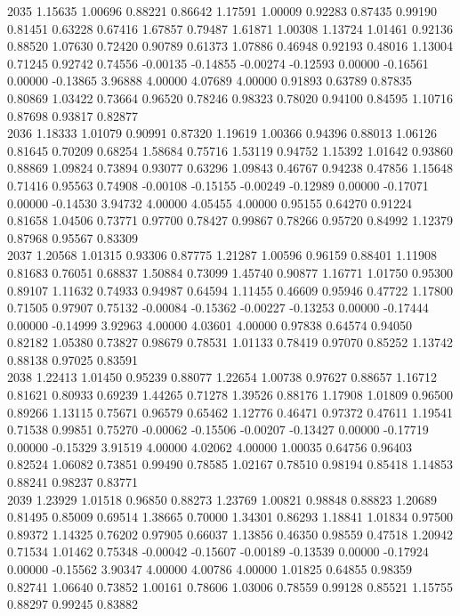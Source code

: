 {2035 1.15635 1.00696 0.88221 0.86642 1.17591 1.00009 0.92283 0.87435 0.99190 0.81451 0.63228 0.67416 1.67857 0.79487 1.61871 1.00308 1.13724 1.01461 0.92136 0.88520 1.07630 0.72420 0.90789 0.61373 1.07886 0.46948 0.92193 0.48016 1.13004 0.71245 0.92742 0.74556 -0.00135 -0.14855 -0.00274 -0.12593 0.00000 -0.16561 0.00000 -0.13865 3.96888 4.00000 4.07689 4.00000 0.91893 0.63789 0.87835 0.80869 1.03422 0.73664 0.96520 0.78246 0.98323 0.78020 0.94100 0.84595 1.10716 0.87698 0.93817 0.82877 \\
2036 1.18333 1.01079 0.90991 0.87320 1.19619 1.00366 0.94396 0.88013 1.06126 0.81645 0.70209 0.68254 1.58684 0.75716 1.53119 0.94752 1.15392 1.01642 0.93860 0.88869 1.09824 0.73894 0.93077 0.63296 1.09843 0.46767 0.94238 0.47856 1.15648 0.71416 0.95563 0.74908 -0.00108 -0.15155 -0.00249 -0.12989 0.00000 -0.17071 0.00000 -0.14530 3.94732 4.00000 4.05455 4.00000 0.95155 0.64270 0.91224 0.81658 1.04506 0.73771 0.97700 0.78427 0.99867 0.78266 0.95720 0.84992 1.12379 0.87968 0.95567 0.83309 \\
2037 1.20568 1.01315 0.93306 0.87775 1.21287 1.00596 0.96159 0.88401 1.11908 0.81683 0.76051 0.68837 1.50884 0.73099 1.45740 0.90877 1.16771 1.01750 0.95300 0.89107 1.11632 0.74933 0.94987 0.64594 1.11455 0.46609 0.95946 0.47722 1.17800 0.71505 0.97907 0.75132 -0.00084 -0.15362 -0.00227 -0.13253 0.00000 -0.17444 0.00000 -0.14999 3.92963 4.00000 4.03601 4.00000 0.97838 0.64574 0.94050 0.82182 1.05380 0.73827 0.98679 0.78531 1.01133 0.78419 0.97070 0.85252 1.13742 0.88138 0.97025 0.83591 \\
2038 1.22413 1.01450 0.95239 0.88077 1.22654 1.00738 0.97627 0.88657 1.16712 0.81621 0.80933 0.69239 1.44265 0.71278 1.39526 0.88176 1.17908 1.01809 0.96500 0.89266 1.13115 0.75671 0.96579 0.65462 1.12776 0.46471 0.97372 0.47611 1.19541 0.71538 0.99851 0.75270 -0.00062 -0.15506 -0.00207 -0.13427 0.00000 -0.17719 0.00000 -0.15329 3.91519 4.00000 4.02062 4.00000 1.00035 0.64756 0.96403 0.82524 1.06082 0.73851 0.99490 0.78585 1.02167 0.78510 0.98194 0.85418 1.14853 0.88241 0.98237 0.83771 \\
2039 1.23929 1.01518 0.96850 0.88273 1.23769 1.00821 0.98848 0.88823 1.20689 0.81495 0.85009 0.69514 1.38665 0.70000 1.34301 0.86293 1.18841 1.01834 0.97500 0.89372 1.14325 0.76202 0.97905 0.66037 1.13856 0.46350 0.98559 0.47518 1.20942 0.71534 1.01462 0.75348 -0.00042 -0.15607 -0.00189 -0.13539 0.00000 -0.17924 0.00000 -0.15562 3.90347 4.00000 4.00786 4.00000 1.01825 0.64855 0.98359 0.82741 1.06640 0.73852 1.00161 0.78606 1.03006 0.78559 0.99128 0.85521 1.15755 0.88297 0.99245 0.83882 \\
}
